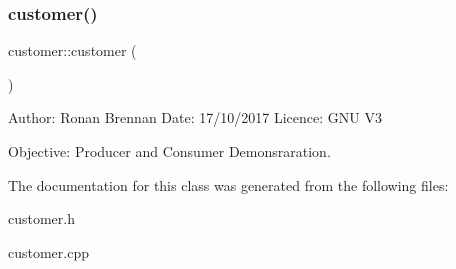 \subsubsection{\texorpdfstring{customer()}{customer()}}
{\footnotesize\ttfamily customer\+::customer (\begin{DoxyParamCaption}{ }\end{DoxyParamCaption})}

Author\+: Ronan Brennan Date\+: 17/10/2017 Licence\+: G\+NU V3

Objective\+: Producer and Consumer Demonsraration. 

The documentation for this class was generated from the following files\+:\begin{DoxyCompactItemize}
\item 
customer.\+h\item 
customer.\+cpp\end{DoxyCompactItemize}
